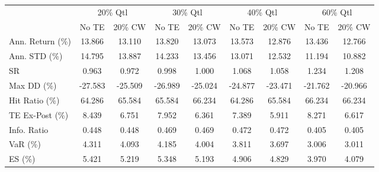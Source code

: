 \begin{tabular}{lcccccccc}
\toprule
{} & \multicolumn{2}{c}{20\% Qtl} & \multicolumn{2}{c}{30\% Qtl} & \multicolumn{2}{c}{40\% Qtl} & \multicolumn{2}{c}{60\% Qtl} \\
{} &   No TE &  20\% CW &   No TE &  20\% CW &   No TE &  20\% CW &   No TE &  20\% CW \\
\midrule
Ann. Return (\%) &  13.866 &  13.110 &  13.820 &  13.073 &  13.573 &  12.876 &  13.436 &  12.766 \\
Ann. STD (\%)    &  14.795 &  13.887 &  14.233 &  13.456 &  13.071 &  12.532 &  11.194 &  10.882 \\
SR              &   0.963 &   0.972 &   0.998 &   1.000 &   1.068 &   1.058 &   1.234 &   1.208 \\
Max DD (\%)      & -27.583 & -25.509 & -26.989 & -25.024 & -24.877 & -23.471 & -21.762 & -20.966 \\
Hit Ratio (\%)   &  64.286 &  65.584 &  65.584 &  66.234 &  64.286 &  65.584 &  66.234 &  66.234 \\
TE Ex-Post (\%)  &   8.439 &   6.751 &   7.952 &   6.361 &   7.389 &   5.911 &   8.271 &   6.617 \\
Info. Ratio     &   0.448 &   0.448 &   0.469 &   0.469 &   0.472 &   0.472 &   0.405 &   0.405 \\
VaR (\%)         &   4.311 &   4.093 &   4.185 &   4.004 &   3.811 &   3.697 &   3.006 &   3.011 \\
ES (\%)          &   5.421 &   5.219 &   5.348 &   5.193 &   4.906 &   4.829 &   3.970 &   4.079 \\
\bottomrule
\end{tabular}
